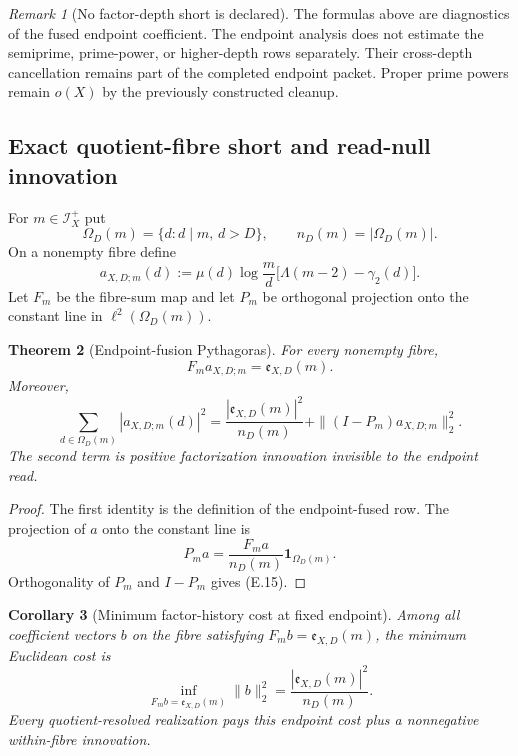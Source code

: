 \documentclass[11pt]{article}
\newtheorem{theorem}{Theorem}[section]
\newtheorem{corollary}[theorem]{Corollary}
\theoremstyle{definition}
\theoremstyle{remark}
\newtheorem{remark}[theorem]{Remark}
\newcommand{\one}{\mathbf 1}
\begin{document}
\begin{remark}[No factor-depth short is declared]
The formulas above are diagnostics of the fused endpoint coefficient.  The endpoint analysis
does not estimate the semiprime, prime-power, or higher-depth rows separately.
Their cross-depth cancellation remains part of the completed endpoint packet.
Proper prime powers remain $o(X)$ by the previously constructed cleanup.
\end{remark}

\subsection{Exact quotient-fibre short and read-null innovation}
\label{subsec:affend-fibre-short}

For $m\in\mathscr I_X^+$ put
\[
 \Omega_D(m)=\{d:d\mid m,\,d>D\},
 \qquad n_D(m)=|\Omega_D(m)|.
\]
On a nonempty fibre define
\[
 a_{X,D;m}(d)
 :=\mu(d)\log\frac md
   \bigl[\Lambda(m-2)-\gamma_2(d)\bigr].
\]
Let $F_m$ be the fibre-sum map and let $P_m$ be orthogonal projection onto the
constant line in $\ell^2(\Omega_D(m))$.

\begin{theorem}[Endpoint-fusion Pythagoras]
\label{thm:affend-fibre-Pythagoras}
For every nonempty fibre,
\begin{equation}
 \label{eq:affend-fibre-sum}
 \boxed{
 F_ma_{X,D;m}
 =\mathfrak e_{X,D}(m).}
 \tag{E.14}
\end{equation}
Moreover,
\begin{equation}
 \label{eq:affend-fibre-Pythagoras}
 \boxed{
 \sum_{d\in\Omega_D(m)}|a_{X,D;m}(d)|^2
 =\frac{|\mathfrak e_{X,D}(m)|^2}{n_D(m)}
  +\|(I-P_m)a_{X,D;m}\|_2^2.}
 \tag{E.15}
\end{equation}
The second term is positive factorization innovation invisible to the endpoint
read.
\end{theorem}

\begin{proof}
The first identity is the definition of the endpoint-fused row.  The
projection of $a$ onto the constant line is
\[
 P_ma=\frac{F_ma}{n_D(m)}\one_{\Omega_D(m)}.
\]
Orthogonality of $P_m$ and $I-P_m$ gives \textup{(E.15)}.
\end{proof}

\begin{corollary}[Minimum factor-history cost at fixed endpoint]
\label{cor:affend-minimum-fibre-cost}
Among all coefficient vectors $b$ on the fibre satisfying
$F_mb=\mathfrak e_{X,D}(m)$, the minimum Euclidean cost is
\begin{equation}
 \label{eq:affend-minimum-fibre-cost}
 \boxed{
 \inf_{F_mb=\mathfrak e_{X,D}(m)}\|b\|_2^2
 =\frac{|\mathfrak e_{X,D}(m)|^2}{n_D(m)}.}
 \tag{E.16}
\end{equation}
Every quotient-resolved realization pays this endpoint cost plus a nonnegative
within-fibre innovation.
\end{corollary}
\end{document}
